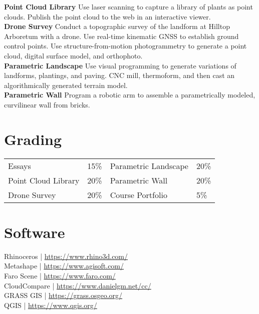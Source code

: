 \documentclass[11pt,article,oneside]{memoir}
\begin{document}
\noindent \textbf{Point Cloud Library}
Use laser scanning to capture a library of plants as point clouds. 
Publish the point cloud to the web in an interactive viewer.
\\

\noindent \textbf{Drone Survey}
Conduct a topographic survey 
of the landform at Hilltop Arboretum
with a drone.
Use real-time kinematic GNSS
to establish ground control points. 
Use structure-from-motion photogrammetry 
to generate a point cloud, 
digital surface model, 
and orthophoto.
\\

\noindent \textbf{Parametric Landscape}
Use visual programming to generate
variations of landforms, plantings, and paving.
CNC mill, thermoform, and then cast 
an algorithmically generated terrain model.
\\

\noindent \textbf{Parametric Wall}
Program a robotic arm to assemble 
a parametrically modeled, curvilinear wall
from bricks.
\\

\section{Grading}
%
\begin{table}[H]
\begin{tabular}{l r @{\hskip 2cm} l @{\hskip 0.5cm} l}
%
Essays & 15\% &  Parametric Landscape & 20\% \\
Point Cloud Library & 20\% & Parametric Wall & 20\%\\
Drone Survey & 20\% & Course Portfolio & 5\% \\
%
\end{tabular}
\end{table}

\section{Software}

Rhinoceros | \url{https://www.rhino3d.com/}\\
Metashape | \url{https://www.agisoft.com/}\\
Faro Scene | \url{https://www.faro.com/}\\
CloudCompare | \url{https://www.danielgm.net/cc/}\\
GRASS GIS | \url{https://grass.osgeo.org/}\\
QGIS | \url{https://www.qgis.org/}\\
\end{document}
